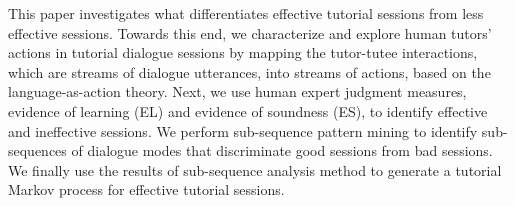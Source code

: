 This paper investigates what differentiates effective tutorial sessions from less effective sessions. Towards this end, we characterize and explore human tutors' actions in tutorial dialogue sessions by mapping the tutor-tutee interactions, which are streams of dialogue utterances, into streams of actions, based on the language-as-action theory. Next, we use human expert judgment measures, evidence of learning (EL) and evidence of soundness (ES), to identify effective and ineffective sessions. We perform sub-sequence pattern mining to identify sub-sequences of dialogue modes that discriminate good sessions from bad sessions. We finally use the results of sub-sequence analysis method to generate a tutorial Markov process for effective tutorial sessions.
